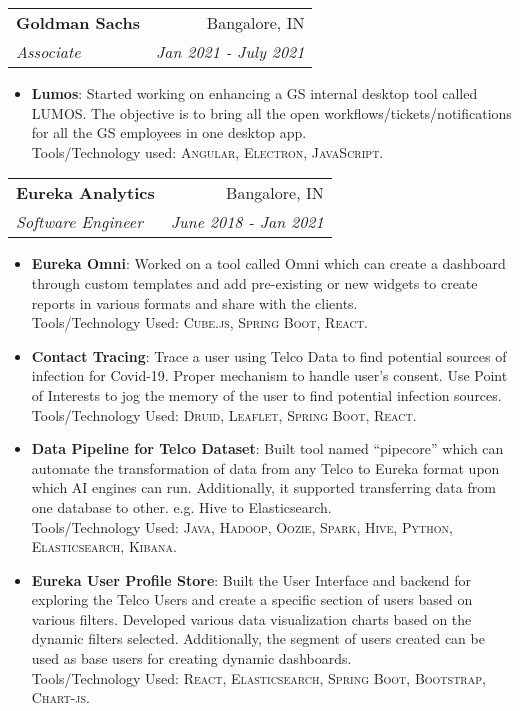 \documentclass[letterpaper,11pt]{article}
\makeatletter
\newcommand{\resumeItem}[2]{
  \item\small{
    \textbf{#1}{: #2 \vspace{-2pt}}
  }
}
\newcommand{\resumeSubheading}[4]{
  \vspace{-1pt}\item
    \begin{tabular*}{0.97\textwidth}[t]{l@{\extracolsep{\fill}}r}
      \textbf{#1} & #2 \\
      \textit{\small#3} & \textit{\small #4} \\
    \end{tabular*}\vspace{-5pt}
}
\newcommand{\resumeItemListStart}{\begin{itemize}}
\newcommand{\resumeItemListEnd}{\end{itemize}\vspace{-5pt}}
\makeatother
\begin{document}
    \resumeSubheading
	{Goldman Sachs}{Bangalore, IN}
	{Associate}{Jan 2021 -  July 2021}
	\resumeItemListStart
    \resumeItem{Lumos}
      {Started working on enhancing a GS internal desktop tool called LUMOS. The objective is to bring all the open workflows/tickets/notifications for all the GS employees in one desktop app. \\ Tools/Technology used: \textsc{Angular, Electron, JavaScript}.}
	\resumeItemListEnd

    \resumeSubheading
    {Eureka Analytics}{Bangalore, IN}
    {Software Engineer}{June 2018 -  Jan 2021}
    \resumeItemListStart
        \resumeItem{Eureka Omni}{Worked on a tool called Omni which can create a dashboard through custom templates and add pre-existing or new widgets to create reports in various formats and share with the clients.  \\ Tools/Technology Used: \textsc{Cube.js, Spring Boot, React}.}
        \resumeItem{Contact Tracing}{Trace a user using Telco Data to find potential sources of infection for Covid-19. Proper mechanism to handle user's consent. Use Point of Interests to jog the memory of the user to find potential infection sources. \\ Tools/Technology Used: \textsc{Druid, Leaflet, Spring Boot, React}.}
        \resumeItem{Data Pipeline for Telco Dataset}
          {Built tool named ``pipecore'' which can automate the transformation of data from any Telco to Eureka format upon which AI engines can run. Additionally, it supported transferring data from one database to other.  e.g. Hive to Elasticsearch. \\ Tools/Technology Used: \textsc{Java, Hadoop, Oozie, Spark, Hive, Python, Elasticsearch, Kibana}.}
          \resumeItem{Eureka User Profile Store}
          {Built the User Interface and backend for exploring the Telco Users and create a specific section of users based on various filters. Developed various data visualization charts based on the dynamic filters selected.  Additionally, the segment of users created can be used as base users for creating dynamic dashboards. \\ Tools/Technology Used: \textsc{React, Elasticsearch, Spring Boot, Bootstrap, Chart-js}.}
      \resumeItemListEnd
\end{document}
